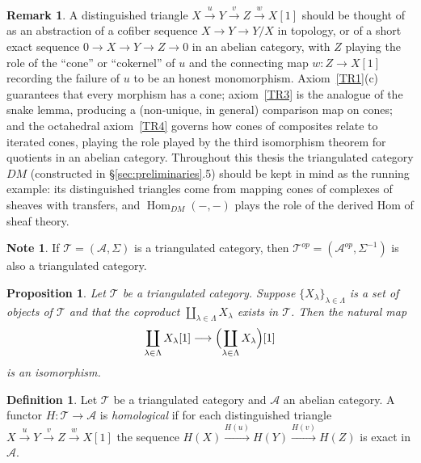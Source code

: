 \documentclass[12pt,a4paper]{article}
\newtheorem{proposition}[theorem]{Proposition}
\theoremstyle{definition}
\newtheorem{definition}[theorem]{Definition}
\newtheorem{remark}[theorem]{Remark}
\newtheorem{note}[theorem]{Note}
\newcommand{\Hom}{\operatorname{Hom}}
\begin{document}
\begin{remark}
A distinguished triangle $X\xrightarrow{u}Y\xrightarrow{v}Z\xrightarrow{w}X[1]$
should be thought of as an abstraction of a cofiber sequence
$X\to Y\to Y/X$ in topology, or of a short exact sequence $0\to X\to Y\to Z\to 0$
in an abelian category, with $Z$ playing the role of the ``cone'' or
``cokernel'' of $u$ and the connecting map $w:Z\to X[1]$ recording the failure of
$u$ to be an honest monomorphism.  Axiom~\ref{TR1}(c) guarantees that every
morphism has a cone; axiom~\ref{TR3} is the analogue of the snake lemma, producing
a (non-unique, in general) comparison map on cones; and the octahedral
axiom~\ref{TR4} governs how cones of composites relate to iterated cones, playing
the role played by the third isomorphism theorem for quotients in an abelian
category.  Throughout this thesis the triangulated category $DM$ (constructed in
\S\ref{sec:preliminaries}.5) should be kept in mind as the running example: its
distinguished triangles come from mapping cones of complexes of sheaves with
transfers, and $\Hom_{DM}(-,-)$ plays the role of the derived Hom of sheaf theory.
\end{remark}

\begin{note}\label{note:opposite}
If $\mathcal{T}=(\mathcal{A},\Sigma)$ is a triangulated category, then
$\mathcal{T}^{op}=(\mathcal{A}^{op},\Sigma^{-1})$ is also a triangulated category.
\end{note}

\begin{proposition}\label{prop:coproducts}
Let $\mathcal{T}$ be a triangulated category.  Suppose $\{X_\lambda\}_{\lambda\in\Lambda}$
is a set of objects of $\mathcal{T}$ and that the coproduct
$\coprod_{\lambda\in\Lambda} X_\lambda$ exists in $\mathcal{T}$.  Then the natural map
\[
  \coprod_{\lambda\in\Lambda} X_\lambda[1]
  \longrightarrow
  \Bigl(\coprod_{\lambda\in\Lambda} X_\lambda\Bigr)[1]
\]
is an isomorphism.
\end{proposition}

\begin{definition}\label{def:homological}
Let $\mathcal{T}$ be a triangulated category and $\mathcal{A}$ an abelian category.
A functor $H:\mathcal{T}\to\mathcal{A}$ is \emph{homological} if for each
distinguished triangle $X\xrightarrow{u} Y\xrightarrow{v} Z\xrightarrow{w} X[1]$
the sequence $H(X)\xrightarrow{H(u)} H(Y)\xrightarrow{H(v)} H(Z)$ is exact in
$\mathcal{A}$.
\end{definition}
\end{document}
